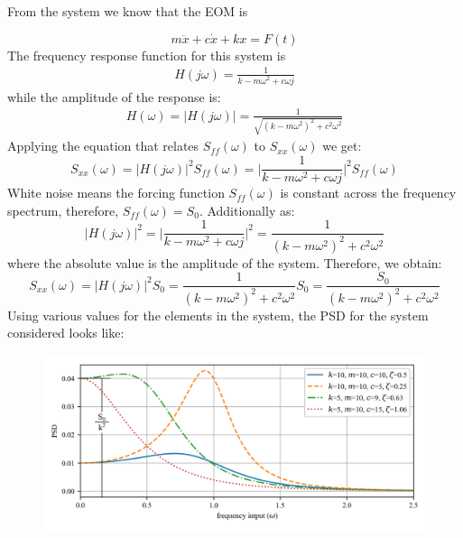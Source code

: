 \documentclass[12pt,a4paper]{article}
\begin{document}
From the system we know that the EOM is 

\begin{equation}
m\ddot{x} +c\dot{x} + kx = F(t)
\end{equation} 
The frequency response function for this system is 
\begin{eqnarray}
	H(j\omega) = \frac{1}{k-m\omega^2+c\omega j}
\end{eqnarray}
while the amplitude of the response is:
\begin{eqnarray}
H(\omega) = |H(j\omega)| = \frac{1}{\sqrt{(k-m\omega^2)^2+c^2\omega^2}}
\end{eqnarray}
Applying the equation that relates $S_{ff}(\omega)$ to $S_{xx}(\omega)$ we get:
\begin{equation}
S_{xx}(\omega) =  |H(j\omega)|^2 S_{ff}(\omega) = \bigg|\frac{1}{k-m\omega^2+c\omega j} \bigg|^2 S_{ff}(\omega) 
\end{equation}
White noise means the forcing function $S_{ff}(\omega)$ is constant across the frequency spectrum, therefore, $S_{ff}(\omega)=S_0$. Additionally as:
\begin{equation}
|H(j\omega)|^2 = \bigg|\frac{1}{k-m\omega^2+c\omega j} \bigg|^2 = \frac{1}{(k-m\omega^2)^2+c^2\omega^2}
\end{equation}
where the absolute value is the amplitude of the system. Therefore, we obtain:
\begin{equation}
S_{xx}(\omega) =  |H(j\omega)|^2 S_{0}= \frac{1}{(k-m\omega^2)^2+c^2\omega^2}S_0 = \frac{S_0}{(k-m\omega^2)^2+c^2\omega^2}
\end{equation}
Using various values for the elements in the system, the PSD for the system considered looks like:
\begin{figure}[H]
	\centering
	\includegraphics[width=1\textwidth]{../../Figures/response_to_white_noise_with_annotation.png}
\end{figure}
\end{document}
